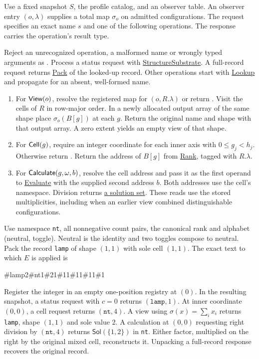 \label{sos-impl-five}
\begingroup\small\raggedright
Use a fixed snapshot $S$, the profile catalog, and an observer table. An observer entry $(o,\lambda)$ supplies a total map $\sigma_o$ on admitted configurations. The request specifies an exact name $s$ and one of the following operations. The response carries the operation's result type.

Reject an unrecognized operation, a malformed name or wrongly typed arguments as . Process a status request with \hyperlink{impl-2}{StructureSubstrate}. A full-record request returns \hyperlink{impl-1}{Pack} of the looked-up record. Other operations start with \hyperlink{impl-2}{Lookup} and propagate  for an absent, well-formed name.
\begin{enumerate}\setlength{\itemsep}{1pt}
\item For $\textsf{View}(o)$, resolve the registered map for $(o,R.\lambda)$ or return . Visit the cells of $R$ in row-major order. In a newly allocated output array of the same shape place $\sigma_o(B[g])$ at each $g$. Return the original name and shape with that output array. A zero extent yields an empty view of that shape.
\item For $\textsf{Cell}(g)$, require an integer coordinate for each inner axis with $0\le g_j<h_j$. Otherwise return . Return the address of $B[g]$ from \hyperlink{impl-3}{Rank}, tagged with $R.\lambda$.
\item For $\textsf{Calculate}(g,\omega,b)$, resolve the cell address and pass it as the first operand to \hyperlink{impl-3}{Evaluate} with the supplied second address $b$. Both addresses use the cell's namespace. Division returns \hyperlink{impl-4}{a solution set}. These reads use the stored multiplicities, including when an earlier view combined distinguishable configurations.
\end{enumerate}

Use namespace \texttt{nt}, all nonnegative count pairs, the canonical rank and alphabet (neutral, toggle). Neutral is the identity and two toggles compose to neutral. Pack the record \texttt{lamp} of shape $(1,1)$ with sole cell $(1,1)$. The exact text to which $E$ is applied is
\begin{center}\#lamp2\#nt1\#21\#11\#11\#11\#1\end{center}
Register the integer in an empty one-position registry at $(0)$. In the resulting snapshot, a status request with $c=0$ returns $(\texttt{lamp},1)$. At inner coordinate $(0,0)$, a cell request returns $(\texttt{nt},4)$. A view using $\sigma(x)=\sum_i x_i$ returns \texttt{lamp}, shape $(1,1)$ and sole value 2. A calculation at $(0,0)$ requesting right division by $(\texttt{nt},4)$ returns $\mathsf{Sol}(\{1,2\})$ in \texttt{nt}. Either factor, multiplied on the right by the original mixed cell, reconstructs it. Unpacking a full-record response recovers the original record.

